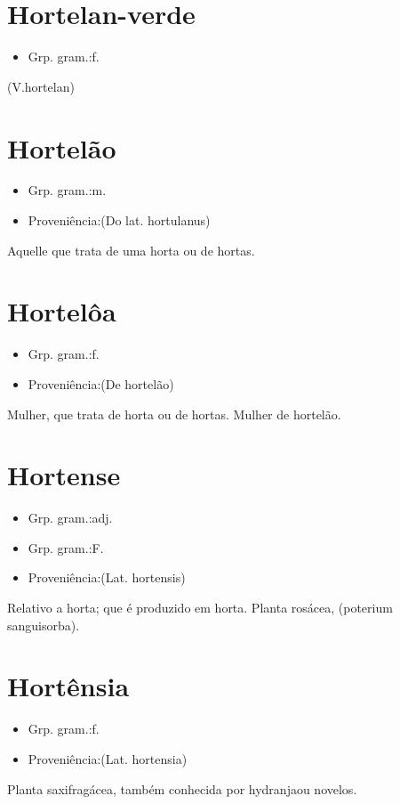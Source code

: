 \documentclass{article}
\begin{document}
\section{Hortelan-verde}
\begin{itemize}
\item {Grp. gram.:f.}
\end{itemize}
(V.hortelan)
\section{Hortelão}
\begin{itemize}
\item {Grp. gram.:m.}
\end{itemize}
\begin{itemize}
\item {Proveniência:(Do lat. \textunderscore hortulanus\textunderscore )}
\end{itemize}
Aquelle que trata de uma horta ou de hortas.
\section{Hortelôa}
\begin{itemize}
\item {Grp. gram.:f.}
\end{itemize}
\begin{itemize}
\item {Proveniência:(De \textunderscore hortelão\textunderscore )}
\end{itemize}
Mulher, que trata de horta ou de hortas.
Mulher de hortelão.
\section{Hortense}
\begin{itemize}
\item {Grp. gram.:adj.}
\end{itemize}
\begin{itemize}
\item {Grp. gram.:F.}
\end{itemize}
\begin{itemize}
\item {Proveniência:(Lat. \textunderscore hortensis\textunderscore )}
\end{itemize}
Relativo a horta; que é produzido em horta.
Planta rosácea, (\textunderscore poterium sanguisorba\textunderscore ).
\section{Hortênsia}
\begin{itemize}
\item {Grp. gram.:f.}
\end{itemize}
\begin{itemize}
\item {Proveniência:(Lat. \textunderscore hortensia\textunderscore )}
\end{itemize}
Planta saxifragácea, também conhecida por \textunderscore hydranja\textunderscore  ou \textunderscore novelos\textunderscore .
\end{document}
